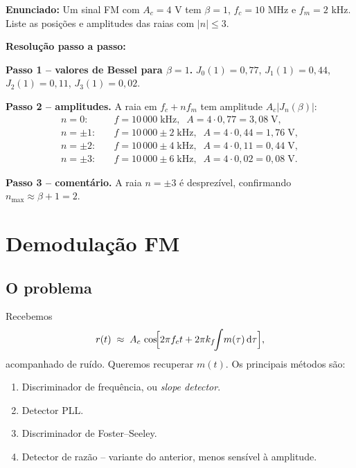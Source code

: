 \documentclass[11pt,a4paper]{article}
\newcommand{\dd}{\,\mathrm{d}}
\begin{document}
\begin{exercicio}
\textbf{Enunciado:} Um sinal FM com $A_c=4$ V tem $\beta=1$, $f_c=10$ MHz e $f_m=2$ kHz. Liste as posições e amplitudes das raias com $|n|\leq 3$.

\textbf{Resolução passo a passo:}

\textbf{Passo 1 -- valores de Bessel para $\beta=1$.}
$J_0(1)=0{,}77$, $J_1(1)=0{,}44$, $J_2(1)=0{,}11$, $J_3(1)=0{,}02$.

\textbf{Passo 2 -- amplitudes.}
A raia em $f_c+n f_m$ tem amplitude $A_c|J_n(\beta)|$:
\begin{align*}
  n=0:&\quad f=10\,000\;\text{kHz},\;\; A=4\!\cdot\!0{,}77=3{,}08\;\text{V},\\
  n=\pm 1:&\quad f=10\,000\pm 2\;\text{kHz},\;\; A=4\!\cdot\!0{,}44=1{,}76\;\text{V},\\
  n=\pm 2:&\quad f=10\,000\pm 4\;\text{kHz},\;\; A=4\!\cdot\!0{,}11=0{,}44\;\text{V},\\
  n=\pm 3:&\quad f=10\,000\pm 6\;\text{kHz},\;\; A=4\!\cdot\!0{,}02=0{,}08\;\text{V}.
\end{align*}

\textbf{Passo 3 -- comentário.}
A raia $n=\pm 3$ é desprezível, confirmando $n_{\max}\approx\beta+1=2$.
\end{exercicio}

\section{Demodulação FM}

\subsection{O problema}

Recebemos
\[
  r(t) \;\approx\; A_c\,\cos\!\Bigl[2\pi f_c t + 2\pi k_f\!\!\int\! m(\tau)\dd\tau\Bigr],
\]
acompanhado de ruído. Queremos recuperar $m(t)$. Os principais métodos são:
\begin{enumerate}
  \item Discriminador de frequência, ou \emph{slope detector}.
  \item Detector PLL.
  \item Discriminador de Foster--Seeley.
  \item Detector de razão -- variante do anterior, menos sensível à amplitude.
\end{enumerate}
\end{document}
